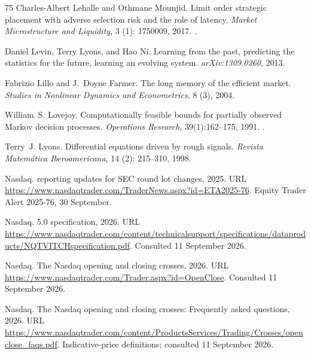 \documentclass[11pt]{article}
\numberwithin{equation}{section}
\theoremstyle{definition}
\theoremstyle{remark}
\theoremstyle{definition}
\begin{document}
\begin{thebibliography}{75}
Charles-Albert Lehalle and Othmane Mounjid.
\newblock Limit order strategic placement with adverse selection risk and the
  role of latency.
\newblock \emph{Market Microstructure and Liquidity}, 3 (1):
  1750009, 2017.
\newblock {}.

Daniel Levin, Terry Lyons, and Hao Ni.
\newblock Learning from the past, predicting the statistics for the future,
  learning an evolving system.
\newblock \emph{arXiv:1309.0260}, 2013.

Fabrizio Lillo and J.~Doyne Farmer.
\newblock The long memory of the efficient market.
\newblock \emph{Studies in Nonlinear Dynamics and Econometrics}, 8
  (3), 2004.

William~S. Lovejoy.
\newblock Computationally feasible bounds for partially observed {Markov}
  decision processes.
\newblock \emph{Operations Research}, 39(1):162--175, 1991.
\newblock {}.

Terry~J. Lyons.
\newblock Differential equations driven by rough signals.
\newblock \emph{Revista Matem\'atica Iberoamericana}, 14 (2):
  215--310, 1998.

{Nasdaq}.
 reporting updates for {SEC} round lot changes, 2025.
\newblock URL \url{https://www.nasdaqtrader.com/TraderNews.aspx?id=ETA2025-76}.
\newblock Equity Trader Alert 2025-76, 30 September.

{Nasdaq}.
 5.0 specification, 2026{}.
\newblock URL
  \url{https://www.nasdaqtrader.com/content/technicalsupport/specifications/dataproducts/NQTVITCHspecification.pdf}.
\newblock Consulted 11 September 2026.

{Nasdaq}.
\newblock The {Nasdaq} opening and closing crosses, 2026{}.
\newblock URL \url{https://www.nasdaqtrader.com/Trader.aspx?id=OpenClose}.
\newblock Consulted 11 September 2026.

{Nasdaq}.
\newblock The {Nasdaq} opening and closing crosses: Frequently asked questions,
  2026{}.
\newblock URL
  \url{https://www.nasdaqtrader.com/content/ProductsServices/Trading/Crosses/openclose_faqs.pdf}.
\newblock Indicative-price definitions; consulted 11 September 2026.


\end{thebibliography}
\end{document}

